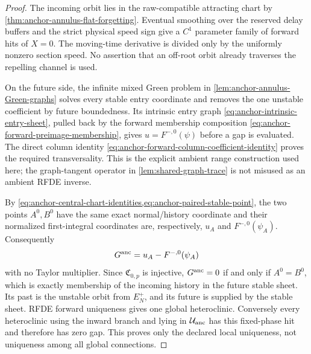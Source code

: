 \begin{proof}
The incoming orbit lies in the raw-compatible attracting chart by
\cref{thm:anchor-annulus-flat-forgetting}.  Eventual smoothing over the
reserved delay buffers and the strict physical speed sign give a \(C^1\)
parameter family of forward hits of \(X=0\).  The moving-time derivative is divided only by the
uniformly nonzero section speed.  No assertion that an off-root orbit already
traverses the repelling channel is used.

On the future side, the infinite mixed Green problem in
\cref{lem:anchor-annulus-Green-graphs} solves every stable entry coordinate
and removes the one unstable coefficient by future boundedness.  Its
intrinsic entry graph \cref{eq:anchor-intrinsic-entry-sheet}, pulled back by
the forward membership composition
\cref{eq:anchor-forward-preimage-membership}, gives
\(u=F^{-,0}(\psi)\) before a gap is evaluated.  The direct column identity
\cref{eq:anchor-forward-column-coefficient-identity} proves the required
transversality.  This is the explicit ambient range construction used here;
the graph-tangent operator in \cref{lem:shared-graph-trace} is not misused as
an ambient RFDE inverse.

By \cref{eq:anchor-central-chart-identities,eq:anchor-paired-stable-point},
the two points \(A^0,B^0\) have the same exact normal/history coordinate and
their normalized first-integral coordinates are, respectively,
\(u_A\) and \(F^{-,0}(\psi_A)\).  Consequently
\begin{equation}
 G^{\rm anc}=u_A-F^{-,0}(\psi_A)                     \label{eq:anchor-gap-exact-coordinate-identity}
\end{equation}
with no Taylor multiplier.  Since \(\mathfrak C_{0,p}\) is injective,
\(G^{\rm anc}=0\) if and only if \(A^0=B^0\), which is exactly membership
of the incoming history in the future stable sheet.  Its past is the
unstable orbit from \(E_N^+\), and its future is supplied by the stable
sheet.  RFDE forward uniqueness gives one global heteroclinic.  Conversely
every heteroclinic using the inward branch and lying in
\(\mathcal U_{\rm anc}\) has this fixed-phase hit and therefore has zero
gap.  This proves only the declared local uniqueness, not uniqueness among
all global connections.


\end{proof}
